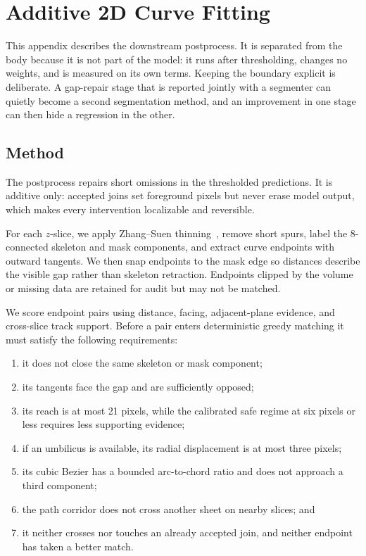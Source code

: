 \section{Additive 2D Curve Fitting}
\label{sec:fitter}

This appendix describes the downstream postprocess.
It is separated from the body because it is not part of the model: it runs after
thresholding, changes no weights, and is measured on its own terms.
Keeping the boundary explicit is deliberate.
A gap-repair stage that is reported jointly with a segmenter can quietly become
a second segmentation method, and an improvement in one stage can then hide a
regression in the other.

\subsection{Method}

The postprocess repairs short omissions in the thresholded predictions.
It is additive only: accepted joins set foreground pixels but never erase model
output, which makes every intervention localizable and reversible.

For each $z$-slice, we apply Zhang--Suen thinning~\cite{zhang1984fast}, remove
short spurs, label the 8-connected skeleton and mask components, and extract
curve endpoints with outward tangents.
We then snap endpoints to the mask edge so distances describe the visible gap
rather than skeleton retraction.
Endpoints clipped by the volume or missing data are retained for audit but may
not be matched.

We score endpoint pairs using distance, facing, adjacent-plane evidence, and
cross-slice track support.
Before a pair enters deterministic greedy matching it must satisfy the
following requirements:

\begin{enumerate}
  \item it does not close the same skeleton or mask component;
  \item its tangents face the gap and are sufficiently opposed;
  \item its reach is at most 21 pixels, while the calibrated safe regime at six
  pixels or less requires less supporting evidence;
  \item if an umbilicus is available, its radial displacement is at most three
  pixels;
  \item its cubic Bezier has a bounded arc-to-chord ratio and does not approach
  a third component;
  \item the path corridor does not cross another sheet on nearby slices; and
  \item it neither crosses nor touches an already accepted join, and neither
  endpoint has taken a better match.
\end{enumerate}

